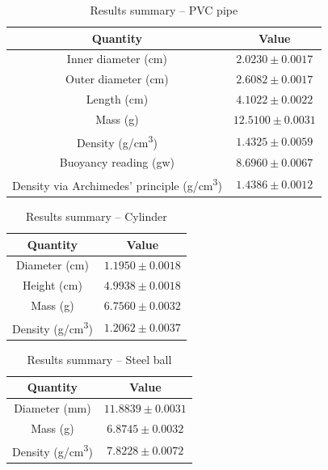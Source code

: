 \begin{table}[htb!]
\centering
\caption{Results summary -- PVC pipe}
\begin{tabular}{cc}
\toprule
Quantity & Value \\
\midrule
Inner diameter (\unit{\cm}) & $2.0230 \pm 0.0017$ \\
Outer diameter (\unit{\cm}) & $2.6082 \pm 0.0017$ \\
Length (\unit{\cm}) & $4.1022 \pm 0.0022$ \\
Mass (\unit{\g}) & $12.5100 \pm 0.0031$ \\
Density (\unit{\g/\cubic\cm}) & $1.4325 \pm 0.0059$ \\
Buoyancy reading (\unit{gw}) & $8.6960 \pm 0.0067$ \\
Density via Archimedes' principle (\unit{\g/\cubic\cm}) & $1.4386 \pm 0.0012$ \\
\bottomrule
\end{tabular}
\end{table}
\begin{table}[htb!]
\centering
\caption{Results summary -- Cylinder}
\begin{tabular}{cc}
\toprule
Quantity & Value \\
\midrule
Diameter (\unit{\cm}) & $1.1950 \pm 0.0018$ \\
Height (\unit{\cm}) & $4.9938 \pm 0.0018$ \\
Mass (\unit{\g}) & $6.7560 \pm 0.0032$ \\
Density (\unit{\g/\cubic\cm}) & $1.2062 \pm 0.0037$ \\
\bottomrule
\end{tabular}
\end{table}
\begin{table}[htb!]
\centering
\caption{Results summary -- Steel ball}
\begin{tabular}{cc}
\toprule
Quantity & Value \\
\midrule
Diameter (\unit{\mm}) & $11.8839 \pm 0.0031$ \\
Mass (\unit{\g}) & $6.8745 \pm 0.0032$ \\
Density (\unit{\g/\cubic\cm}) & $7.8228 \pm 0.0072$ \\
\bottomrule
\end{tabular}
\end{table}
